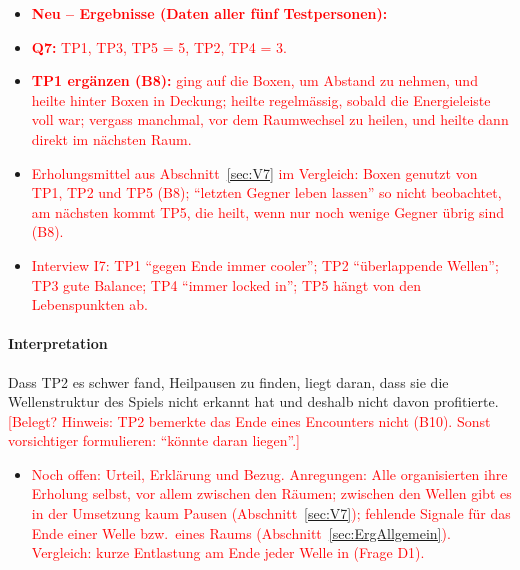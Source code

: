 \documentclass[../Main.tex]{subfiles}
\begin{document}
\begin{itemize}[leftmargin=1.5cm]
    \item \textcolor{red}{\textbf{Neu -- Ergebnisse (Daten aller fünf Testpersonen):}}
    \item \textcolor{red}{\textbf{Q7:} TP1, TP3, TP5 = 5, TP2, TP4 = 3.}
    \item \textcolor{red}{\textbf{TP1 ergänzen (B8):} ging auf die Boxen, um Abstand zu nehmen, und heilte hinter Boxen in Deckung; heilte regelmässig, sobald die Energieleiste voll war; vergass manchmal, vor dem Raumwechsel zu heilen, und heilte dann direkt im nächsten Raum.}
    \item \textcolor{red}{Erholungsmittel aus Abschnitt~\ref{sec:V7} im Vergleich: Boxen genutzt von TP1, TP2 und TP5 (B8); \enquote{letzten Gegner leben lassen} so nicht beobachtet, am nächsten kommt TP5, die heilt, wenn nur noch wenige Gegner übrig sind (B8).}
    \item \textcolor{red}{Interview I7: TP1 \enquote{gegen Ende immer cooler}; TP2 \enquote{überlappende Wellen}; TP3 gute Balance; TP4 \enquote{immer locked in}; TP5 hängt von den Lebenspunkten ab.}
\end{itemize}

\paragraph{Interpretation}
Dass TP2 es schwer fand, Heilpausen zu finden, liegt daran, dass sie die Wellenstruktur des Spiels nicht erkannt hat und deshalb nicht davon profitierte. \textcolor{red}{[Belegt? Hinweis: TP2 bemerkte das Ende eines Encounters nicht (B10). Sonst vorsichtiger formulieren: \enquote{könnte daran liegen}.]}

\begin{itemize}[leftmargin=1.5cm]
    \item \textcolor{red}{Noch offen: Urteil, Erklärung und Bezug. Anregungen: Alle organisierten ihre Erholung selbst, vor allem zwischen den Räumen; zwischen den Wellen gibt es in der Umsetzung kaum Pausen (Abschnitt~\ref{sec:V7}); fehlende Signale für das Ende einer Welle bzw.\ eines Raums (Abschnitt~\ref{sec:ErgAllgemein}). Vergleich: kurze Entlastung am Ende jeder Welle in  (Frage D1).}
\end{itemize}
\end{document}
